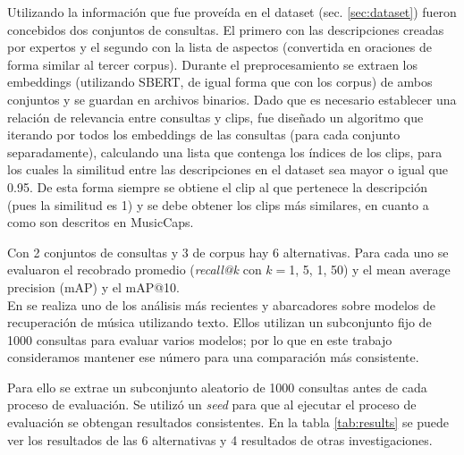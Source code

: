 Utilizando la información que fue proveída en el dataset (sec. \ref{sec:dataset}) fueron concebidos dos conjuntos de consultas. El primero con las descripciones creadas por expertos y el segundo con la lista de aspectos (convertida en oraciones de forma similar al tercer corpus). Durante el preprocesamiento se extraen los embeddings (utilizando SBERT, de igual forma que con los corpus) de ambos conjuntos y se guardan en archivos binarios. Dado que es necesario establecer una relación de relevancia entre consultas y clips, fue diseñado un algoritmo que iterando por todos los embeddings de las consultas (para cada conjunto separadamente), calculando una lista que contenga los índices de los clips, para los cuales la similitud entre las descripciones en el dataset sea mayor o igual que 0.95. De esta forma siempre se obtiene el clip al que pertenece la descripción (pues la similitud es 1) y se debe obtener los clips más similares, en cuanto a como son descritos en MusicCaps.

Con 2 conjuntos de consultas y 3 de corpus hay 6 alternativas. Para cada uno se evaluaron el recobrado promedio (\textit{recall@k} con $k=$1, 5, 1, 50) y el mean average precision (mAP) y el mAP@10. \\
En \cite{Doh2022TowardUT} se realiza uno de los análisis más recientes y abarcadores sobre modelos de recuperación de música utilizando texto. Ellos utilizan un subconjunto fijo de 1000 consultas para evaluar varios modelos; por lo que en este trabajo consideramos mantener ese número para una comparación más consistente.

Para ello se extrae un subconjunto aleatorio de 1000 consultas antes de cada proceso de evaluación. Se utilizó un \textit{seed} para que al ejecutar el proceso de evaluación se obtengan resultados consistentes. En la tabla \ref{tab:results} se puede ver los resultados de las 6 alternativas y 4 resultados de otras investigaciones.

